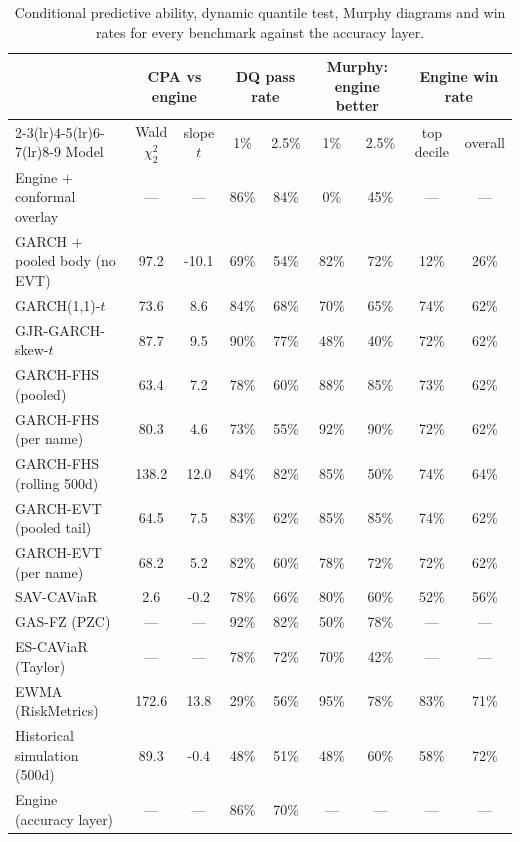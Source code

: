 \documentclass[11pt]{article}
\begin{document}
\begin{table}[htbp]
\centering
\begin{threeparttable}
\caption{Conditional predictive ability, dynamic quantile test, Murphy diagrams and win rates for every benchmark against the accuracy layer.}
\label{tab:bench-tests}
\footnotesize
\begin{tabular}{lcccccccc}
\toprule
& \multicolumn{2}{c}{CPA vs engine} & \multicolumn{2}{c}{DQ pass rate} & \multicolumn{2}{c}{Murphy: engine better} & \multicolumn{2}{c}{Engine win rate} \\
\cmidrule(lr){2-3}\cmidrule(lr){4-5}\cmidrule(lr){6-7}\cmidrule(lr){8-9}
Model & Wald $\chi^2_2$ & slope $t$ & 1\% & 2.5\% & 1\% & 2.5\% & top decile & overall \\
\midrule
Engine $+$ conformal overlay & --- & --- & 86\% & 84\% & 0\% & 45\% & --- & --- \\
GARCH $+$ pooled body (no EVT) & 97.2 & -10.1 & 69\% & 54\% & 82\% & 72\% & 12\% & 26\% \\
GARCH(1,1)-$t$ & 73.6 & 8.6 & 84\% & 68\% & 70\% & 65\% & 74\% & 62\% \\
GJR-GARCH-skew-$t$ & 87.7 & 9.5 & 90\% & 77\% & 48\% & 40\% & 72\% & 62\% \\
GARCH-FHS (pooled) & 63.4 & 7.2 & 78\% & 60\% & 88\% & 85\% & 73\% & 62\% \\
GARCH-FHS (per name) & 80.3 & 4.6 & 73\% & 55\% & 92\% & 90\% & 72\% & 62\% \\
GARCH-FHS (rolling 500d) & 138.2 & 12.0 & 84\% & 82\% & 85\% & 50\% & 74\% & 64\% \\
GARCH-EVT (pooled tail) & 64.5 & 7.5 & 83\% & 62\% & 85\% & 85\% & 74\% & 62\% \\
GARCH-EVT (per name) & 68.2 & 5.2 & 82\% & 60\% & 78\% & 72\% & 72\% & 62\% \\
SAV-CAViaR & 2.6 & -0.2 & 78\% & 66\% & 80\% & 60\% & 52\% & 56\% \\
GAS-FZ (PZC) & --- & --- & 92\% & 82\% & 50\% & 78\% & --- & --- \\
ES-CAViaR (Taylor) & --- & --- & 78\% & 72\% & 70\% & 42\% & --- & --- \\
EWMA (RiskMetrics) & 172.6 & 13.8 & 29\% & 56\% & 95\% & 78\% & 83\% & 71\% \\
Historical simulation (500d) & 89.3 & -0.4 & 48\% & 51\% & 48\% & 60\% & 58\% & 72\% \\
\midrule
Engine (accuracy layer) & --- & --- & 86\% & 70\% & --- & --- & --- & --- \\
\bottomrule

\end{tabular}
\end{threeparttable}
\end{table}
\end{document}
